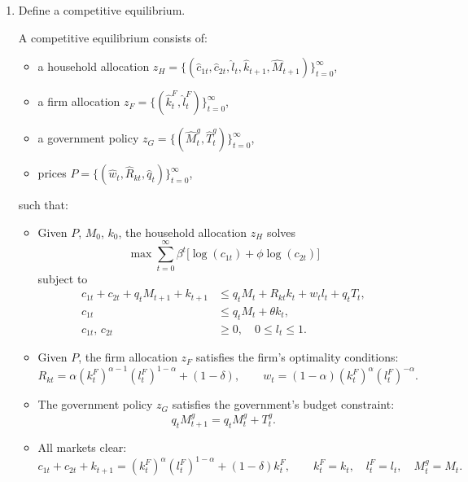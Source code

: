 \documentclass[11pt,english]{article}
\begin{document}
\begin{enumerate}
    \item[(a)] Define a competitive equilibrium.
    \begin{solution}
A competitive equilibrium consists of:
\begin{itemize}
    \item a household allocation $z_H = \{(\hat{c}_{1t},\hat{c}_{2t},\hat{l}_t,
        \hat{k}_{t+1},\hat{M}_{t+1})\}_{t=0}^\infty$,
    \item a firm allocation $z_F = \{(\hat{k}_t^F, \hat{l}_t^F)\}_{t=0}^\infty$,
    \item a government policy $z_G = \{(\hat{M}_t^g, \hat{T}_t^g)\}_{t=0}^\infty$,
    \item prices $P = \{(\hat{w}_t, \hat{R}_{kt}, \hat{q}_t)\}_{t=0}^\infty$,
\end{itemize}
such that:
\begin{itemize}
    \item Given $P$, $M_0$, $k_0$, the household allocation
        $z_H$ solves
        \[
            \max \sum_{t=0}^\infty \beta^t\bigl[\log(c_{1t}) + \phi\log(c_{2t})\bigr]
        \]
        subject to
        \begin{align*}
            c_{1t} + c_{2t} + q_t M_{t+1} + k_{t+1}
            &\leq q_t M_t + R_{kt} k_t + w_t l_t + q_t T_t, \\
            c_{1t} &\leq q_t M_t + \theta k_t, \\
            c_{1t},\, c_{2t} &\geq 0, \quad 0 \leq l_t \leq 1.
        \end{align*}
 
    \item Given $P$, the firm allocation $z_F$ satisfies the
        firm's optimality conditions:
        \[
            R_{kt} = \alpha (k_t^F)^{\alpha-1}(l_t^F)^{1-\alpha} + (1-\delta),
            \qquad
            w_t = (1-\alpha)(k_t^F)^{\alpha}(l_t^F)^{-\alpha}.
        \]
 
    \item The government policy $z_G$ satisfies the
        government's budget constraint:
        \[
            q_t M_{t+1}^g = q_t M_t^g + T_t^g.
        \]
 
    \item All markets clear:
        \[
            c_{1t} + c_{2t} + k_{t+1}
            = (k_t^F)^\alpha(l_t^F)^{1-\alpha} + (1-\delta)k_t^F,
            \qquad
            k_t^F = k_t, \quad l_t^F = l_t, \quad M_t^g = M_t.
        \]
\end{itemize}
\end{solution}
 

\end{enumerate}
\end{document}
